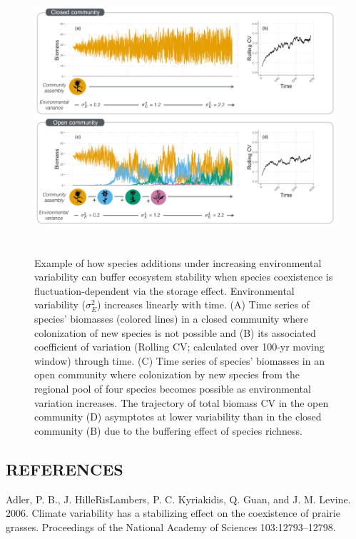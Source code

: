 \documentclass[12pt,]{article}
\begin{document}
\begin{figure}[!ht]
  \centering
      \includegraphics[height=4in]{./components/coexistence_stability_infographic_v2.png}
  \caption{Example of how species additions under increasing environmental variability can buffer ecosystem stability when species coexistence is fluctuation-dependent via the storage effect. Environmental variability ($\sigma^2_E$) increases linearly with time. (A) Time series of species' biomasses (colored lines) in a closed community where colonization of new species is not possible and (B) its associated coefficient of variation (Rolling CV; calculated over 100-yr moving window) through time. (C) Time series of species' biomasses in an open community where colonization by new species from the regional pool of four species becomes possible as environmental variation increases. The trajectory of total biomass CV in the open community (D) asymptotes at lower variability than in the closed community (B) due to the buffering effect of species richness.}
\end{figure}

\newpage{}

\setlength{\parindent}{0ex} \singlespacing

\subsection*{REFERENCES}\label{references}

Adler, P. B., J. HilleRisLambers, P. C. Kyriakidis, Q. Guan, and J. M.
Levine. 2006. Climate variability has a stabilizing effect on the
coexistence of prairie grasses. Proceedings of the National Academy of
Sciences 103:12793--12798.
\end{document}
